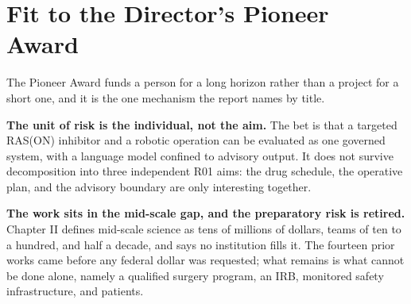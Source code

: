 \section{Fit to the Director's Pioneer Award}

The Pioneer Award funds a person for a long horizon rather than a project for a
short one, and it is the one mechanism the report names by title.

\textbf{The unit of risk is the individual, not the aim.} The bet is that a
targeted RAS(ON) inhibitor and a robotic operation can be evaluated as one
governed system, with a language model confined to advisory output. It does not
survive decomposition into three independent R01 aims: the drug schedule, the
operative plan, and the advisory boundary are only interesting together.

\textbf{The work sits in the mid-scale gap, and the preparatory risk is
retired.} Chapter II defines mid-scale science as tens of millions of dollars,
teams of ten to a hundred, and half a decade, and says no institution fills it.
The fourteen prior works came before any federal dollar was requested; what
remains is what cannot be done alone, namely a qualified surgery program, an
IRB, monitored safety infrastructure, and patients.

